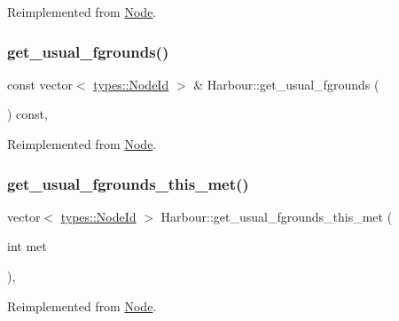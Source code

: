 Reimplemented from \mbox{\hyperlink{class_node_ab6ef20b380f13109c31d1e4635c1c100}{Node}}.

\mbox{\label{class_harbour_ad7369a9ec8a9032dbdd99e2d945415de}} 
\subsubsection{\texorpdfstring{get\_usual\_fgrounds()}{get\_usual\_fgrounds()}}
{\footnotesize\ttfamily const vector$<$ \mbox{\hyperlink{classtypes_1_1_node_id}{types\+::\+Node\+Id}} $>$ \& Harbour\+::get\+\_\+usual\+\_\+fgrounds (\begin{DoxyParamCaption}{ }\end{DoxyParamCaption}) const\hspace{0.3cm}{\ttfamily [override]}, {\ttfamily [virtual]}}



Reimplemented from \mbox{\hyperlink{class_node_ac1c3ddd1751f913d42655888b7bbc24f}{Node}}.

\mbox{\label{class_harbour_a324bed1382950129e692eb3e4302d700}} 
\subsubsection{\texorpdfstring{get\_usual\_fgrounds\_this\_met()}{get\_usual\_fgrounds\_this\_met()}}
{\footnotesize\ttfamily vector$<$ \mbox{\hyperlink{classtypes_1_1_node_id}{types\+::\+Node\+Id}} $>$ Harbour\+::get\+\_\+usual\+\_\+fgrounds\+\_\+this\+\_\+met (\begin{DoxyParamCaption}\item[{int}]{met }\end{DoxyParamCaption})\hspace{0.3cm}{\ttfamily [override]}, {\ttfamily [virtual]}}



Reimplemented from \mbox{\hyperlink{class_node_a604f051bec95c8ba70e5d5461c9599a3}{Node}}.

\mbox{\label{class_harbour_a4678c9c337d7253b47863ab3a252f3d4}} 
